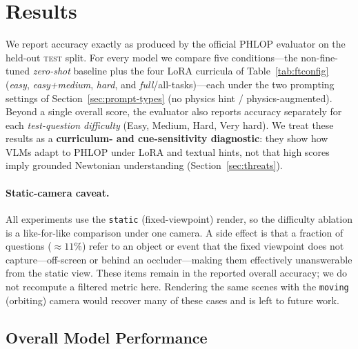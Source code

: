 \documentclass[conference]{IEEEtran}
\begin{document}
\section{Results}
\label{sec:finetune-results}

We report accuracy exactly as produced by the official PHLOP evaluator on the held-out \textsc{test} split. For every model we compare five conditions---the non-fine-tuned \emph{zero-shot} baseline plus the four LoRA curricula of Table~\ref{tab:ftconfig} (\textit{easy}, \textit{easy+medium}, \textit{hard}, and \textit{full}/all-tasks)---each under the two prompting settings of Section~\ref{sec:prompt-types} (no physics hint / physics-augmented). Beyond a single overall score, the evaluator also reports accuracy separately for each \emph{test-question difficulty} (Easy, Medium, Hard, Very hard). We treat these results as a \textbf{curriculum- and cue-sensitivity diagnostic}: they show how VLMs adapt to PHLOP under LoRA and textual hints, not that high scores imply grounded Newtonian understanding (Section~\ref{sec:threats}).

\paragraph{Static-camera caveat.}
All experiments use the \texttt{static} (fixed-viewpoint) render, so the difficulty ablation is a like-for-like comparison under one camera. A side effect is that a fraction of questions ($\approx 11\%$) refer to an object or event that the fixed viewpoint does not capture---off-screen or behind an occluder---making them effectively unanswerable from the static view. These items remain in the reported overall accuracy; we do not recompute a filtered metric here. Rendering the same scenes with the \texttt{moving} (orbiting) camera would recover many of these cases and is left to future work.

\subsection{Overall Model Performance}
\end{document}
